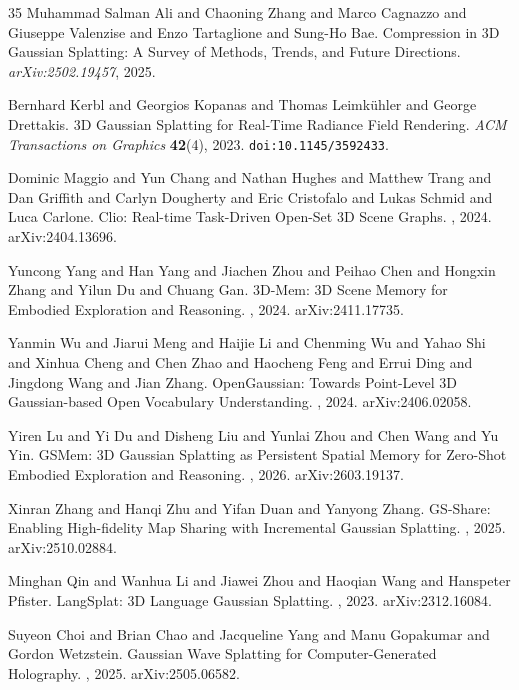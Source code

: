 \documentclass[11pt]{article}
\begin{document}
\begin{thebibliography}{35}
Muhammad Salman Ali and Chaoning Zhang and Marco Cagnazzo and Giuseppe
Valenzise and Enzo Tartaglione and Sung-Ho Bae.
\newblock Compression in 3D Gaussian Splatting: A Survey of Methods,
Trends, and Future Directions.
\newblock \emph{arXiv:2502.19457}, 2025.

Bernhard Kerbl and Georgios Kopanas and Thomas Leimk{\"u}hler and George
Drettakis.
\newblock 3D Gaussian Splatting for Real-Time Radiance Field Rendering.
\newblock \emph{ACM Transactions on Graphics} \textbf{42}(4), 2023.
\newblock \texttt{doi:10.1145/3592433}.

Dominic Maggio and Yun Chang and Nathan Hughes and Matthew Trang and Dan
Griffith and Carlyn Dougherty and Eric Cristofalo and Lukas Schmid and
Luca Carlone.
\newblock Clio: Real-time Task-Driven Open-Set 3D Scene Graphs.
, 2024.
\newblock arXiv:2404.13696.

Yuncong Yang and Han Yang and Jiachen Zhou and Peihao Chen and Hongxin
Zhang and Yilun Du and Chuang Gan.
\newblock 3D-Mem: 3D Scene Memory for Embodied Exploration and
Reasoning.
, 2024.
\newblock arXiv:2411.17735.

Yanmin Wu and Jiarui Meng and Haijie Li and Chenming Wu and Yahao Shi
and Xinhua Cheng and Chen Zhao and Haocheng Feng and Errui Ding and
Jingdong Wang and Jian Zhang.
\newblock OpenGaussian: Towards Point-Level 3D Gaussian-based Open
Vocabulary Understanding.
, 2024.
\newblock arXiv:2406.02058.

Yiren Lu and Yi Du and Disheng Liu and Yunlai Zhou and Chen Wang and Yu
Yin.
\newblock GSMem: 3D Gaussian Splatting as Persistent Spatial Memory for
Zero-Shot Embodied Exploration and Reasoning.
, 2026.
\newblock arXiv:2603.19137.

Xinran Zhang and Hanqi Zhu and Yifan Duan and Yanyong Zhang.
\newblock GS-Share: Enabling High-fidelity Map Sharing with Incremental
Gaussian Splatting.
, 2025.
\newblock arXiv:2510.02884.

Minghan Qin and Wanhua Li and Jiawei Zhou and Haoqian Wang and Hanspeter
Pfister.
\newblock LangSplat: 3D Language Gaussian Splatting.
, 2023.
\newblock arXiv:2312.16084.

Suyeon Choi and Brian Chao and Jacqueline Yang and Manu Gopakumar and
Gordon Wetzstein.
\newblock Gaussian Wave Splatting for Computer-Generated Holography.
, 2025.
\newblock arXiv:2505.06582.


\end{thebibliography}
\end{document}
